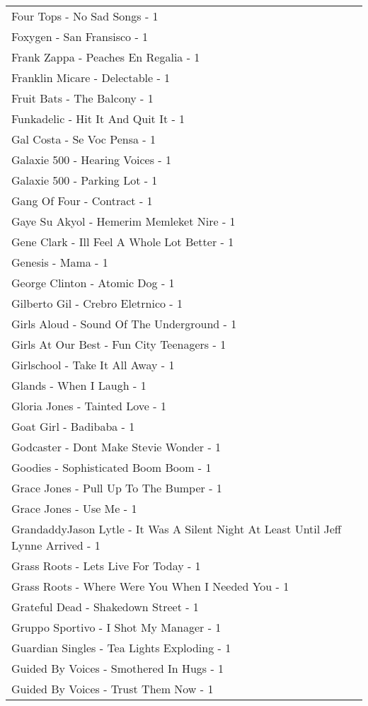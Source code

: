 \documentclass[
]{article}
\begin{document}
\begin{longtable}{l}
Four Tops - No Sad Songs - 1 \\ 
Foxygen - San Fransisco - 1 \\ 
Frank Zappa - Peaches En Regalia - 1 \\ 
Franklin Micare - Delectable - 1 \\ 
Fruit Bats - The Balcony - 1 \\ 
Funkadelic - Hit It And Quit It - 1 \\ 
Gal Costa - Se Voc Pensa - 1 \\ 
Galaxie 500 - Hearing Voices - 1 \\ 
Galaxie 500 - Parking Lot - 1 \\ 
Gang Of Four - Contract - 1 \\ 
Gaye Su Akyol - Hemerim Memleket Nire - 1 \\ 
Gene Clark - Ill Feel A Whole Lot Better - 1 \\ 
Genesis - Mama - 1 \\ 
George Clinton - Atomic Dog - 1 \\ 
Gilberto Gil - Crebro Eletrnico - 1 \\ 
Girls Aloud - Sound Of The Underground - 1 \\ 
Girls At Our Best - Fun City Teenagers - 1 \\ 
Girlschool - Take It All Away - 1 \\ 
Glands - When I Laugh - 1 \\ 
Gloria Jones - Tainted Love - 1 \\ 
Goat Girl - Badibaba - 1 \\ 
Godcaster - Dont Make Stevie Wonder - 1 \\ 
Goodies - Sophisticated Boom Boom - 1 \\ 
Grace Jones - Pull Up To The Bumper - 1 \\ 
Grace Jones - Use Me - 1 \\ 
GrandaddyJason Lytle - It Was A Silent Night At Least Until Jeff Lynne Arrived - 1 \\ 
Grass Roots - Lets Live For Today - 1 \\ 
Grass Roots - Where Were You When I Needed You - 1 \\ 
Grateful Dead - Shakedown Street - 1 \\ 
Gruppo Sportivo - I Shot My Manager - 1 \\ 
Guardian Singles - Tea Lights Exploding - 1 \\ 
Guided By Voices - Smothered In Hugs - 1 \\ 
Guided By Voices - Trust Them Now - 1 \\ 

\end{longtable}
\end{document}
